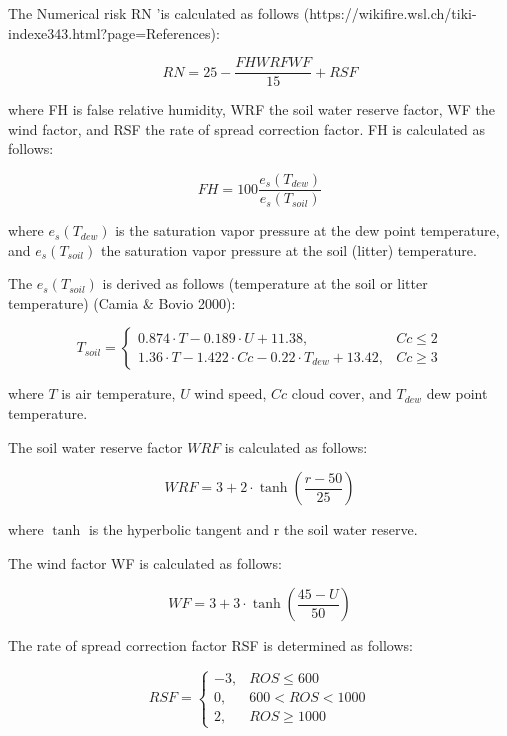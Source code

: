 {{	The Numerical risk RN 'is calculated as follows (https://wikifire.wsl.ch/tiki-indexe343.html?page=References):
	
	\begin{equation}
	RN = 25 - \frac{FH WRF WF}{15} + RSF
	\end{equation}
	
	where FH is false relative humidity, WRF the soil water reserve factor, WF the wind factor, and RSF the rate of spread correction factor. FH is calculated as follows:
	
	\begin{equation}
	FH = 100 \frac{e_{s}(T_{dew})}{e_{s}(T_{soil})}
	\end{equation}
	
	where $e_{s}(T_{dew})$ is the saturation vapor pressure at the dew point temperature, and $e_{s}(T_{soil})$ the saturation vapor pressure at the soil (litter) temperature.
	
	The  $e_{s}(T_{soil})$  is derived as follows (temperature at the soil or litter temperature) (Camia \& Bovio 2000):
	
	\begin{equation}
	T_{soil}= \left\{
	\begin{array}{lr}
	 0.874 \cdot T -  0.189 \cdot U + 11.38, & Cc \leq 2 \\
	 1.36 \cdot T - 1.422 \cdot Cc - 0.22 \cdot T_{dew} + 13.42, & Cc \geq 3
	\end{array} 
	\right.
	\end{equation}
	
	
	where $T$ is air temperature, $U$ wind speed, $Cc$ cloud cover, and $T_{dew}$ dew point temperature.
	
	The soil water reserve factor $WRF$ is calculated as follows:
	
	\begin{equation}
	WRF =  3 + 2 \cdot \tanh(\frac{r - 50}{25})
	\end{equation}
	
	where $\tanh$ is the hyperbolic tangent and r the soil water reserve. 
	
	The wind factor WF is calculated as follows:
	
	\begin{equation}
	WF = 3 + 3 \cdot \tanh(\frac{45 - U}{50})
	\end{equation}
	
	The rate of spread correction factor RSF is determined as follows:
	
	\begin{equation}
	RSF= \left\{
	\begin{array}{lr}
	-3,  & ROS \leq 600 \\
	0,  &  600 < ROS < 1000 \\
	2, & ROS \geq 1000
	\end{array} 
	\right.
	\end{equation}
	
}}
